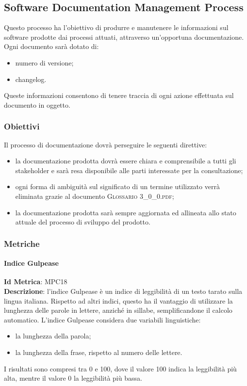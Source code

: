 	\subsection{Software Documentation Management Process}
	Questo processo ha l'obiettivo di produrre e manutenere le informazioni sul software prodotte dai processi
	attuati, attraverso un'opportuna documentazione.
	Ogni documento sarà dotato di:
		\begin{itemize}
			\item numero di versione;
			\item changelog.
		\end{itemize}
	Queste informazioni consentono di tenere traccia di ogni azione effettuata sul documento in oggetto.
		
		\subsubsection{Obiettivi}
		Il processo di documentazione dovrà perseguire le seguenti direttive:
			\begin{itemize}
				\item la documentazione prodotta dovrà essere chiara e comprensibile a tutti gli stakeholder e sarà resa disponibile alle parti interessate per la consultazione;
				\item ogni forma di ambiguità sul significato di un termine utilizzato verrà eliminata grazie al documento \textsc{Glossario 3\_0\_0.pdf};
				\item la documentazione prodotta sarà sempre aggiornata ed allineata allo stato attuale del
				processo di sviluppo del prodotto.
			\end{itemize}
		
		\subsubsection{Metriche}
			
			\paragraph{Indice Gulpease}
			\textbf{Id Metrica}: \hypertarget{MPC18}{MPC18}\\
			\textbf{Descrizione}: l'indice Gulpease è un indice di leggibilità di un testo tarato sulla lingua italiana.
			Rispetto ad altri indici, questo ha il vantaggio di utilizzare la lunghezza delle parole in lettere, anziché in sillabe, semplificandone il calcolo automatico. L'indice Gulpease considera due variabili linguistiche:
			\begin{itemize}
				\item la lunghezza della parola;
				\item la lunghezza della frase, rispetto al numero delle lettere.
			\end{itemize}
			I risultati sono compresi tra 0 e 100, dove il valore 100 indica la leggibilità più alta, mentre il valore 0 la leggibilità più bassa.
			
